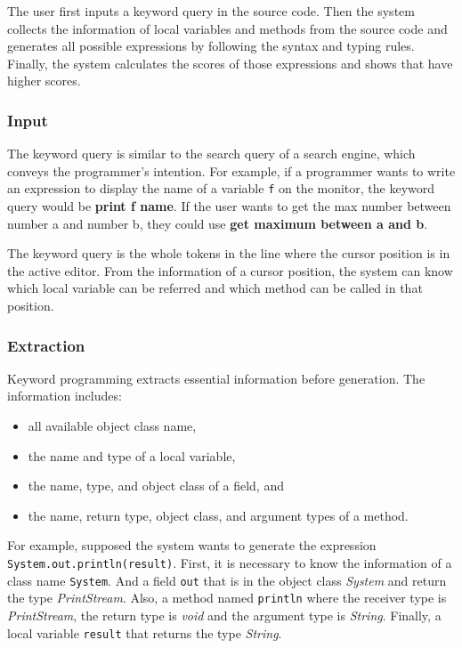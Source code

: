 \documentclass[PRO,english]{ipsj}
\begin{document}
The user first inputs a keyword query in the source code. Then the system collects the information of local variables and methods from the source code and generates all possible expressions by following the syntax and typing rules. Finally, the system calculates the scores of those expressions and shows that have higher scores.
\subsubsection{Input}
The keyword query is similar to the search query of a search engine, which conveys the programmer’s intention. For example, if a programmer wants to write an expression to display the name of a variable \texttt{f} on the monitor, the keyword query would be \textbf{print f name}. If the user wants to get the max number between number a and number b, they could use \textbf{get maximum between a and b}.

The keyword query is the whole tokens in the line where the cursor position is in the active editor. From the information of a cursor position, the system can know which local variable can be referred and which method can be called in that position.

\subsubsection{Extraction}
Keyword programming extracts essential information before generation. The information includes:
\begin{itemize}
\item all available object class name,
\item the name and type of a local variable,
\item the name, type, and object class of a field, and
\item the name, return type, object class, and argument types of a method.
\end{itemize}

For example, supposed the system wants to generate the expression \texttt{System.out.println(result)}. First, it is necessary to know the information of a class name \texttt{System}. And a field \texttt{out} that is in the object class \textit{System} and return the type \textit{PrintStream}. Also, a method named \texttt{println} where the receiver type is \textit{PrintStream}, the return type is \textit{void} and the argument type is \textit{String}. Finally, a local variable \texttt{result} that returns the type \textit{String}.
\end{document}
